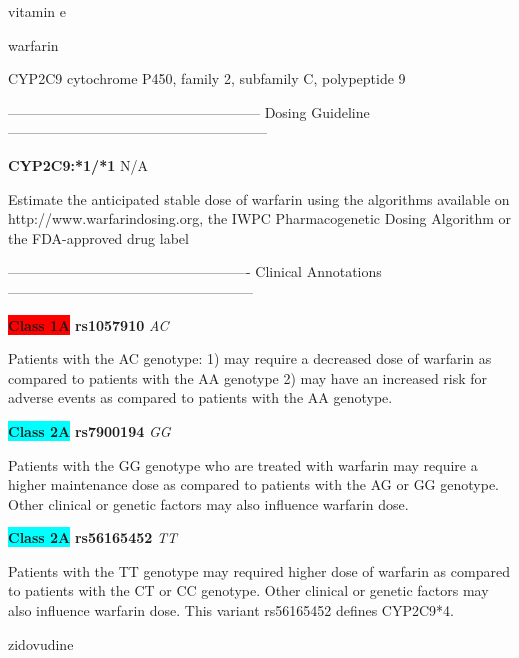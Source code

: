 \documentclass{resume} %
\begin{document}
\begin{rSection}{ vitamin e }
\end{rSection}\begin{rSection}{ warfarin }
\item[]

\begin{rSubsection}{ CYP2C9 }{ cytochrome P450, family 2, subfamily C, polypeptide 9 }{}{}
\item[]
\item[] ------------------------------------------------------ Dosing Guideline --------------------------------------------------------\newline
\item[]
\item[] \textbf{ CYP2C9:*1/*1 } N/A

\item[] Estimate the anticipated stable dose of warfarin using the algorithms available on http://www.warfarindosing.org, the IWPC Pharmacogenetic Dosing Algorithm or the FDA-approved drug label
\item[] ---------------------------------------------------- Clinical Annotations -----------------------------------------------------\newline
\item \textbf{\colorbox{red} {Class 1A}} \textbf{ rs1057910 } \textit{ AC }
\item[] Patients with the AC genotype: 1) may require a decreased dose of warfarin as compared to patients with the AA genotype 2) may have an increased risk for adverse events as compared to patients with the AA genotype.\item \textbf{\colorbox{cyan} {Class 2A}} \textbf{ rs7900194 } \textit{ GG }
\item[] Patients with the GG genotype who are treated with warfarin may require a higher maintenance dose as compared to patients with the AG or GG genotype.  Other clinical or genetic factors may also influence warfarin dose.\item \textbf{\colorbox{cyan} {Class 2A}} \textbf{ rs56165452 } \textit{ TT }
\item[] Patients with the TT genotype may required higher dose of warfarin as compared to patients with the CT or CC genotype. Other clinical or genetic factors may also influence  warfarin dose. This variant rs56165452 defines CYP2C9*4.
\end{rSubsection}

\end{rSection}\begin{rSection}{ zidovudine }
\item[]


\end{rSection}
\end{document}
